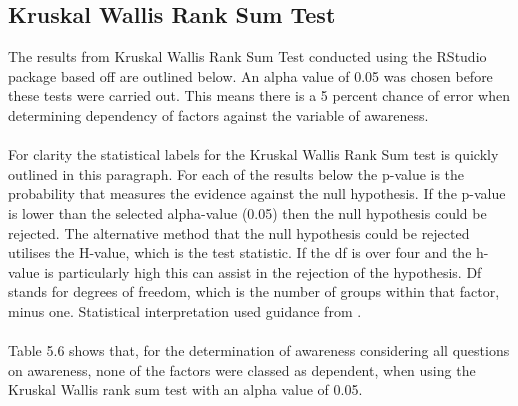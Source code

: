 \subsection{Kruskal Wallis Rank Sum Test}
The results from Kruskal Wallis Rank Sum Test conducted using the RStudio package based off \cite{hollander_nonparametric_2014} are outlined below.  An alpha value of 0.05 was chosen before these tests were carried out. This means there is a 5 percent chance of error when determining dependency of factors against the variable of awareness.
\paragraph{}
For clarity the statistical labels for the Kruskal Wallis Rank Sum test is quickly outlined in this paragraph. For each of the results below the p-value is the probability that measures the evidence against the null hypothesis.  If the p-value is lower than the selected alpha-value (0.05) then the null hypothesis could be rejected. The alternative method that the null hypothesis could be rejected utilises the H-value, which is the test statistic. If the df is over four and the h-value is particularly high this can assist in the rejection of the hypothesis. Df stands for degrees of freedom, which is the number of groups within that factor, minus one. Statistical interpretation used guidance from \cite{minitab_interpret_2022}.
\paragraph{}

Table 5.6 shows that, for the determination of awareness considering all questions on awareness, none of the factors were classed as dependent, when using the Kruskal Wallis rank sum test with an alpha value of 0.05. 

